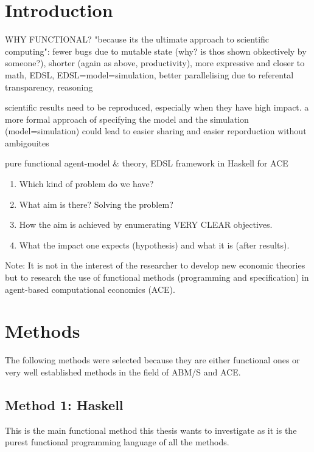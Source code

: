 \documentclass{article}
\begin{document}

\section{Introduction}
WHY FUNCTIONAL? "because its the ultimate approach to scientific computing": fewer bugs due to mutable state (why? is thos shown obkectively by someone?), shorter (again as above, productivity), more expressive and closer to math, EDSL, EDSL=model=simulation, better parallelising due to referental transparency, reasoning

scientific results need to be reproduced, especially when they have high impact. a more formal approach of specifying the model and the simulation (model=simulation) could lead to easier sharing and easier reporduction without ambigouites

pure functional agent-model \& theory, EDSL framework in Haskell for ACE

\begin{enumerate}
\item Which kind of problem do we have?
\item What aim is there? Solving the problem? 
\item How the aim is achieved by enumerating VERY CLEAR objectives.
\item What the impact one expects (hypothesis) and what it is (after results).
\end{enumerate}

Note: It is not in the interest of the researcher to develop new economic theories but to research the use of functional methods (programming and specification) in agent-based computational economics (ACE).


\section{Methods}
The following methods were selected because they are either functional ones or very well established methods in the field of ABM/S and ACE. 

\subsection{Method 1: Haskell}
This is the main functional method this thesis wants to investigate as it is the purest functional programming language of all the methods.
\end{document}
